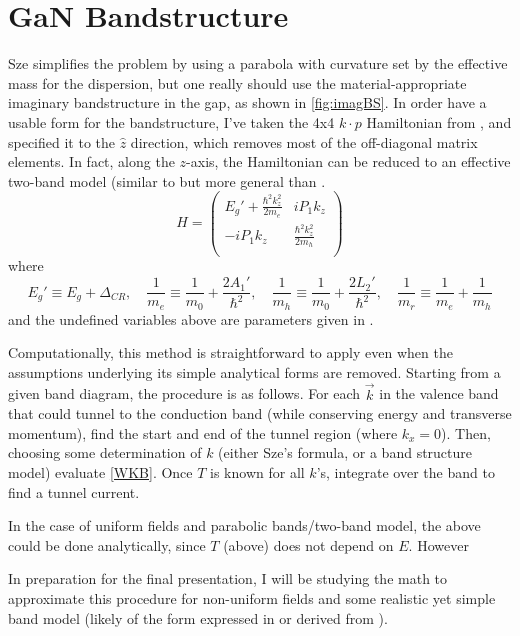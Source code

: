 \section{GaN Bandstructure}
Sze simplifies the problem by using a parabola with curvature set by the effective mass for the dispersion, but one really should use the material-appropriate imaginary bandstructure in the gap, as shown in \ref{fig:imagBS}.  In order have a usable form for the bandstructure, I've taken the 4x4 $k\cdot p$ Hamiltonian from \cite{Rinke_2008}, and specified it to the $\hat{z}$ direction, which removes most of the off-diagonal matrix elements.  In fact, along the $z$-axis, the Hamiltonian can be reduced to an effective two-band model (similar to but more general than \cite{Kane_1960}.
\[
  H=\begin{pmatrix}
    E_g'+\frac{\hbar^2k_z^2}{2m_e} & iP_1k_z\\
    -iP_1k_z & \frac{\hbar^2k_z^2}{2m_h} \\
  \end{pmatrix}
\]
where
\[
  E_g'\equiv E_g+\Delta_{CR}, \quad \frac{1}{m_e}\equiv\frac{1}{m_0}+\frac{2A_1'}{\hbar^2}, \quad \frac{1}{m_h}\equiv\frac{1}{m_0}+\frac{2L_2'}{\hbar^2}, \quad
\frac{1}{m_r}\equiv\frac{1}{m_e}+\frac{1}{m_h}
\]
and the undefined variables above are parameters given in \cite{Rinke_2008}.



Computationally, this method is straightforward to apply even when the assumptions underlying its simple analytical forms are removed.  Starting from a given band diagram, the procedure is as follows.  For each $\vec{k}$ in the valence band that could tunnel to the conduction band (while conserving energy and transverse momentum), find the start and end of the tunnel region (where $k_x=0$).  Then, choosing some determination of $k$ (either Sze's formula, or a band structure model) evaluate \ref{WKB}.  Once $T$ is known for all $k$'s, integrate over the band to find a tunnel current.



In the case of uniform fields and parabolic bands/two-band model, the above could be done analytically, since $T$ (above) does not depend on $E$.  However


In preparation for the final presentation, I will be studying the math to approximate this procedure for non-uniform fields and some realistic yet simple band model (likely of the form expressed in \cite{Guan_2011} or derived from \cite{Piprek}).